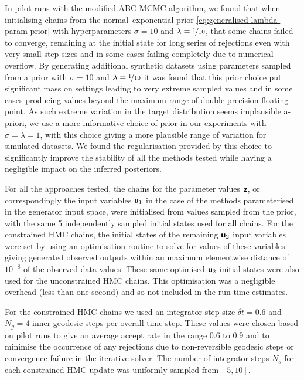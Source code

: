 In pilot runs with the modified \ac{ABC} \ac{MCMC} algorithm, we found that when initialising chains from the normal--exponential prior \eqref{eq:generalised-lambda-param-prior} with hyperparameters $\sigma = 10$ and $\lambda = \nicefrac{1}{10}$, that some chains failed to converge, remaining at the initial state for long series of rejections even with very small step sizes and in some cases failing completely due to numerical overflow. By generating additional synthetic datasets using parameters sampled from a prior with  $\sigma = 10$ and $\lambda = \nicefrac{1}{10}$ it was found that this prior choice put significant mass on settings leading to very extreme sampled values and in some cases producing values beyond the maximum range of double precision floating point. As such extreme variation in the target distribution seems implausible a-priori, we use a more informative choice of prior in our experiments with $\sigma = \lambda = 1$, with this choice giving a more plausible range of variation for simulated datasets. We found the regularisation provided by this choice to significantly improve the stability of all the methods tested while having a negligible impact on the inferred posteriors.

For all the approaches tested, the chains for the parameter values $\boldsymbol{\mathsf{z}}$, or correspondingly the input variables $\boldsymbol{\mathsf{u}}_1$ in the case of the methods parameterised in the generator input space, were initialised from values sampled from the prior, with the same 5 independently sampled initial states used for all chains. For the constrained \ac{HMC} chains, the initial states of the remaining $\boldsymbol{\mathsf{u}}_2$ input variables were set by using an optimisation routine to solve for values of these variables giving generated observed outputs within an maximum elementwise distance of $10^{-8}$ of the observed data values. These same optimised $\boldsymbol{\mathsf{u}}_2$ initial states were also used for the unconstrained \ac{HMC} chains. This optimisation was a negligible overhead (less than one second) and so not included in the run time estimates.

For the constrained \ac{HMC} chains we used an integrator step size $\delta t = 0.6$ and $N_g = 4$ inner geodesic steps per overall time step. These values were chosen based on pilot runs to give an average accept rate in the range 0.6 to 0.9 \citep{betancourt2014optimizing} and to minimise the occurrence of any rejections due to non-reversible geodesic steps or convergence failure in the iterative solver. The number of integrator steps $N_s$ for each constrained \ac{HMC} update was uniformly sampled from $[5,10]$.

